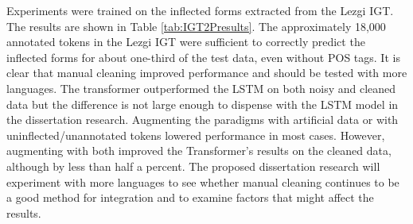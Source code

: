Experiments were trained on the inflected forms extracted from the Lezgi IGT. The results are shown in Table \ref{tab:IGT2Presults}. The approximately 18,000 annotated tokens in the Lezgi IGT were sufficient to correctly predict the inflected forms for about one-third of the test data, even without POS tags. It is clear that manual cleaning improved performance and should be tested with more languages. The transformer outperformed the LSTM on both noisy and cleaned data but the difference is not large enough to dispense with the LSTM model in the dissertation research. 
Augmenting the paradigms with artificial data or with uninflected/unannotated tokens lowered performance in most cases. However, augmenting with both improved the Transformer's results on the cleaned data, although by less than half a percent. 
The proposed dissertation research will experiment with more languages to see whether manual cleaning continues to be a good method for integration and to examine factors that might affect the results.  


